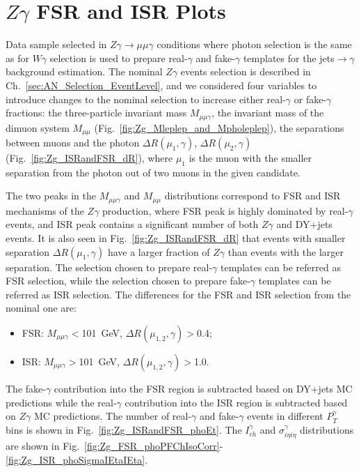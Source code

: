\chapter{$Z\gamma$ FSR and ISR Plots}
\label{sec:ZgFSRandISRplots}

Data sample selected in $Z\gamma\rightarrow\mu\mu\gamma$ conditions where photon selection is the same as for $W\gamma$ selection is used to prepare real-$\gamma$ and fake-$\gamma$ templates for the jets$\rightarrow\gamma$ background estimation. The nominal $Z\gamma$ events selection is described in Ch.~\ref{sec:AN_Selection_EventLevel}, and we considered four variables to introduce changes to the nominal selection to increase either real-$\gamma$ or fake-$\gamma$ fractions: the three-particle invariant mass $M_{\mu\mu\gamma}$, the invariant mass of the dimuon system $M_{\mu\mu}$ (Fig.~\ref{fig:Zg_Mleplep_and_Mpholeplep}), the separations between muons and the photon $\Delta{R}(\mu_1,\gamma)$, $\Delta{R}(\mu_2,\gamma)$ (Fig.~\ref{fig:Zg_ISRandFSR_dR}), where $\mu_1$ is the muon with the smaller separation from the photon out of two muons in the given candidate. 

The two peaks in the $M_{\mu\mu\gamma}$ and $M_{\mu\mu}$ distributions correspond to FSR and ISR mechanisms of the $Z\gamma$ production, where FSR peak is highly dominated by real-$\gamma$ events, and ISR peak contains a significant number of both $Z\gamma$ and DY+jets events. It is also seen in Fig.~\ref{fig:Zg_ISRandFSR_dR} that events with smaller separation $\Delta{R}(\mu_1,\gamma)$ have a larger fraction of $Z\gamma$ than events with the larger separation. The selection chosen to prepare real-$\gamma$ templates can be referred as FSR selection, while the selection chosen to prepare fake-$\gamma$ templates can be referred as ISR selection. The differences for the FSR and ISR selection from the nominal one are:
\begin{itemize}
  \item FSR: $M_{\mu\mu\gamma}<$101~GeV, $\Delta{R}(\mu_{1,2},\gamma)>$0.4;
  \item ISR: $M_{\mu\mu\gamma}>$101~GeV, $\Delta{R}(\mu_{1,2},\gamma)>$1.0.
\end{itemize}

The fake-$\gamma$ contribution into the FSR region is subtracted based on DY+jets MC predictions while the real-$\gamma$ contribution into the ISR region is subtracted based on $Z\gamma$ MC predictions. The number of real-$\gamma$ and fake-$\gamma$ events in different $P_T^\gamma$ bins is shown in Fig.~\ref{fig:Zg_ISRandFSR_phoEt}. The $I_{ch}^\gamma$ and $\sigma_{i \eta i \eta}^\gamma$ distributions are shown in Fig.~\ref{fig:Zg_FSR_phoPFChIsoCorr}-\ref{fig:Zg_ISR_phoSigmaIEtaIEta}.

